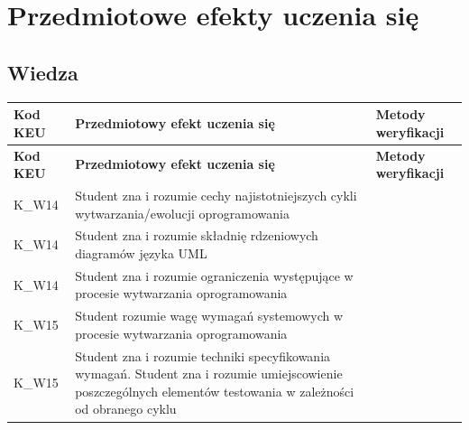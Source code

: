 \documentclass[12pt, a4paper]{article}
\newcommand{\thdrule}{\noalign{\global\setlength{\extrarowheight}{0pt}}}
\newcommand{\thdend}{\noalign{\global\setlength{\extrarowheight}{3pt}}}
\begin{document}
\section{Przedmiotowe efekty uczenia się}

\subsection*{Wiedza}
{\scriptsize
\begin{longtable}{m{1.6cm}m{9.0cm}m{4.2cm}}
\thdrule\toprule
\rowcolor{pjatkRed} {\color{white}\footnotesize\textbf{\vphantom{Ag}Kod KEU}} & {\color{white}\footnotesize\textbf{\vphantom{Ag}Przedmiotowy efekt uczenia się}} & {\color{white}\footnotesize\textbf{\vphantom{Ag}Metody weryfikacji}} \\
\midrule\thdend
\endfirsthead
\thdrule\toprule
\rowcolor{pjatkRed} {\color{white}\footnotesize\textbf{\vphantom{Ag}Kod KEU}} & {\color{white}\footnotesize\textbf{\vphantom{Ag}Przedmiotowy efekt uczenia się}} & {\color{white}\footnotesize\textbf{\vphantom{Ag}Metody weryfikacji}} \\
\midrule\thdend
\endhead
  \rowcolor{tableRowLight} K\_W14 & Student zna i rozumie cechy najistotniejszych cykli wytwarzania/ewolucji oprogramowania &  \\
  \rowcolor{tableRowAlt} K\_W14 & Student zna i rozumie składnię rdzeniowych diagramów języka UML &  \\
  \rowcolor{tableRowLight} K\_W14 & Student zna i rozumie ograniczenia występujące w procesie wytwarzania oprogramowania &  \\
  \rowcolor{tableRowAlt} K\_W15 & Student rozumie wagę wymagań systemowych w procesie wytwarzania oprogramowania &  \\
  \rowcolor{tableRowLight} K\_W15 & Student zna i rozumie techniki specyfikowania wymagań. Student zna i rozumie umiejscowienie poszczególnych elementów testowania w zależności od obranego cyklu &  \\
\bottomrule
\end{longtable}}
\end{document}
